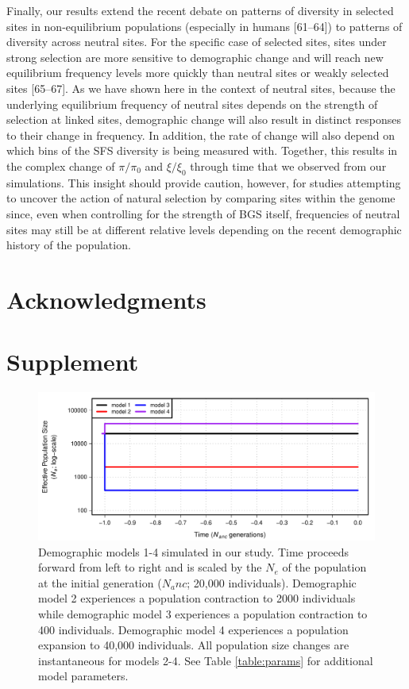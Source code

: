 \documentclass[9pt,twocolumn,twoside]{rilabRxiv}
\newcommand{\beginsupplement}{%
        \setcounter{table}{0}
        \renewcommand{\thetable}{S\arabic{table}}%
        \setcounter{figure}{0}
        \renewcommand{\thefigure}{S\arabic{figure}}%
     }
\begin{document}
Finally, our results extend the recent
debate on patterns of diversity in selected sites in non-equilibrium
populations (especially in humans [61--64]) to patterns of diversity
across neutral sites. For the specific case of selected sites, sites
under strong selection are more sensitive to demographic change and will
reach new equilibrium frequency levels more quickly than neutral sites
or weakly selected sites [65--67]. As we have shown here in the
context of neutral sites, because the underlying equilibrium frequency
of neutral sites depends on the strength of selection at linked sites,
demographic change will also result in distinct responses to their
change in frequency. In addition, the rate of change will also depend on
which bins of the SFS diversity is being measured with. Together, this
results in the complex change of $\pi/\pi_0$ and
$\xi/\xi_0$ through time that we observed from our simulations.
This insight should provide caution, however, for studies attempting to
uncover the action of natural selection by comparing sites within the
genome since, even when controlling for the strength of BGS itself,
frequencies of neutral sites may still be at different relative levels
depending on the recent demographic history of the population.

\section{Acknowledgments}




\onecolumn
\section*{Supplement}
     
\beginsupplement

\blindtext
\begin{figure}[h!]
\includegraphics[width=.9\linewidth]{figures/FigS1.pdf}
\caption{Demographic models 1-4 simulated in our study. 
Time proceeds forward from left to right and is scaled by the $N_e$ of the population at the initial generation ($N_anc$; 20,000 individuals).  
Demographic model 2 experiences a population contraction to 2000 individuals while demographic model 3 experiences a population contraction to 400 individuals. 
Demographic model 4 experiences a population expansion to 40,000 individuals. 
All population size changes are instantaneous for models 2-4. 
See Table \ref{table:params} for additional model parameters.}
\label{fig:S1}
\end{figure}
\end{document}
